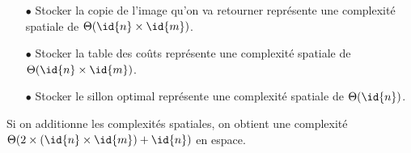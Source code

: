 \documentclass[a4paper, 11pt, oneside]{article}
\begin{document}
\begin{enumerate}
	\item[$\bullet$] Stocker la copie de l'image qu'on va retourner représente une complexité spatiale de $\Theta(\id{n} \times \id{m})$.
	\item[$\bullet$] Stocker la table des coûts représente une complexité spatiale de $\Theta(\id{n} \times \id{m})$.
	\item[$\bullet$] Stocker le sillon optimal représente une complexité spatiale de $\Theta(\id{n})$.
\end{enumerate}

\noindent Si on additionne les complexités spatiales, on obtient une complexité $\Theta(2 \times (\id{n} \times \id{m}) + \id{n})$ en espace.
\end{document}
